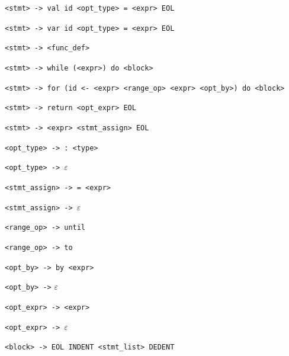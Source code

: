 \begin{gramatika}
    \item \verb|<stmt> -> val id <opt_type> = <expr> EOL|
    \item \verb|<stmt> -> var id <opt_type> = <expr> EOL|
    \item \verb|<stmt> -> <func_def>|
    \item \verb|<stmt> -> while (<expr>) do <block>|
    \item \verb|<stmt> -> for (id <- <expr> <range_op> <expr> <opt_by>) do <block>|
    \item \verb|<stmt> -> return <opt_expr> EOL|
    \item \verb|<stmt> -> <expr> <stmt_assign> EOL|
    \item \verb|<opt_type> -> : <type>|
    \item \verb|<opt_type> -> |$\varepsilon$
    \item \verb|<stmt_assign> -> = <expr>|
    \item \verb|<stmt_assign> -> |$\varepsilon$
    \item \verb|<range_op> -> until|
    \item \verb|<range_op> -> to|
    \item \verb|<opt_by> -> by <expr>|
    \item \verb|<opt_by> ->| $\varepsilon$
    \item \verb|<opt_expr> -> <expr>|
    \item \verb|<opt_expr> -> |$\varepsilon$
    \item \verb|<block> -> EOL INDENT <stmt_list> DEDENT| 
\end{gramatika}


